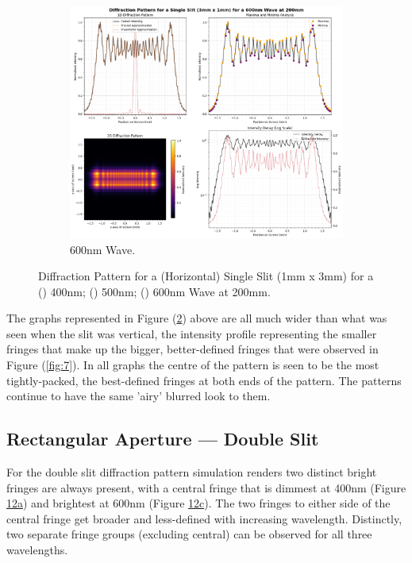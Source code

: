 \documentclass[12pt]{article}
\begin{document}
\begin{figure}[H] \ContinuedFloat
    \centering
    \begin{subfigure}[b]{.48\textwidth}
        \centering
        \includegraphics[width=\linewidth]{hsslit_600nm.png}
        \caption{600nm Wave.}
        \label{fig:11c}
    \end{subfigure}
    \caption{Diffraction Pattern for a (Horizontal) Single Slit (1mm x 3mm) for a () 400nm; () 500nm; () 600nm Wave at 200mm.}
    \label{fig:11}
\end{figure}

The graphs represented in Figure (\ref{fig:11}) above are all much wider than what was seen when the slit was vertical, the intensity profile representing the smaller fringes that make up the bigger, better-defined fringes
that were observed in Figure (\ref{fig:7}). In all graphs the centre of the pattern is seen to be the most tightly-packed, the best-defined fringes at both ends of the pattern. The patterns continue to have the same 'airy' blurred look
to them.

\subsection{Rectangular Aperture — Double Slit}

For the double slit diffraction pattern simulation renders two distinct bright fringes are always present, with a central fringe that is dimmest at 400nm (Figure \hyperref[fig:12a]{12a}) and brightest at 600nm (Figure \hyperref[fig:12c]{12c}).
The two fringes to either side of the central fringe get broader and less-defined with increasing wavelength. Distinctly, two separate fringe groups (excluding central) can be observed for all three wavelengths.
\end{document}

